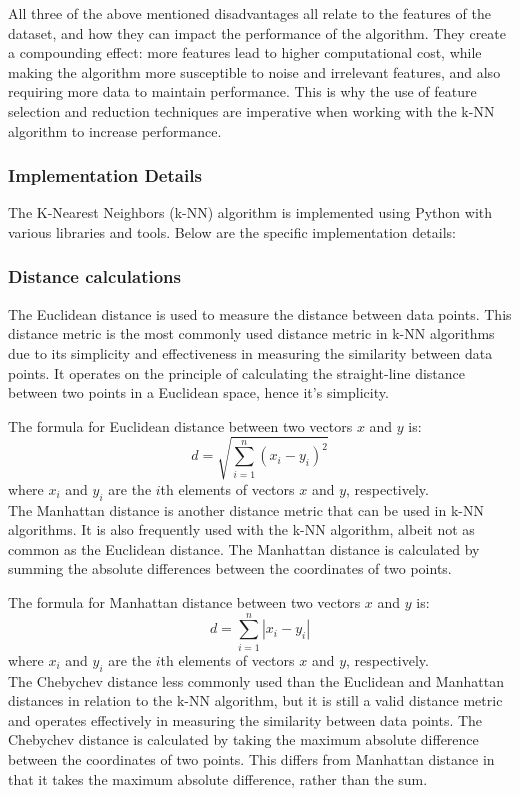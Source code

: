 All three of the above mentioned disadvantages all relate to the features of the dataset, and how they can impact the performance of the algorithm.
They create a compounding effect: more features lead to higher computational cost, while making the algorithm more susceptible to noise and irrelevant features,
and also requiring more data to maintain performance. This is why the use of feature selection and reduction techniques are imperative 
when working with the k-NN algorithm to increase performance.


\subsubsection{Implementation Details}
The K-Nearest Neighbors (k-NN) algorithm is implemented using Python with various libraries and tools.
Below are the specific implementation details:

\subsubsection*{Distance calculations}
The Euclidean distance is used to measure the distance between data points. 
This distance metric is the most commonly used distance metric in k-NN algorithms
due to its simplicity and effectiveness in measuring the similarity between data points\cite{IBM2023}.
It operates on the principle of calculating the straight-line distance between two points in a Euclidean space, hence it's simplicity.

The formula for Euclidean distance between two vectors \(x\) and \(y\) is:
\[ d = \sqrt{\sum_{i=1}^{n} (x_i - y_i)^2} \]
where \(x_i\) and \(y_i\) are the \(i\)th elements of vectors \(x\) and \(y\), respectively.\\

The Manhattan distance is another distance metric that can be used in k-NN algorithms. It is also frequently used with the k-NN algorithm,
albeit not as common as the Euclidean distance.
The Manhattan distance is calculated by summing the absolute differences between the coordinates of two points.

The formula for Manhattan distance between two vectors \(x\) and \(y\) is:
\[ d = \sum_{i=1}^{n} |x_i - y_i| \]
where \(x_i\) and \(y_i\) are the \(i\)th elements of vectors \(x\) and \(y\), respectively.\\

The Chebychev distance less commonly used than the Euclidean and Manhattan distances
in relation to the k-NN algorithm, but it is still a valid distance metric and operates effectively in measuring the similarity between data points.
The Chebychev distance is calculated by taking the maximum absolute difference between the coordinates of two points. This differs from Manhattan distance
in that it takes the maximum absolute difference, rather than the sum.

